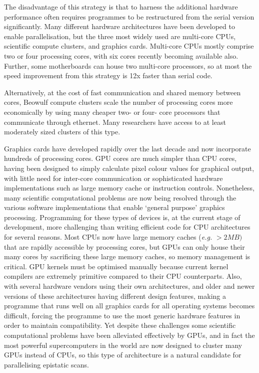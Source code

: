 The disadvantage of this strategy is that to harness the additional hardware performance often requires programmes to be restructured from the serial version significantly. Many different hardware architectures have been developed to enable parallelisation, but the three most widely used are multi-core CPUs, scientific compute clusters, and graphics cards. Multi-core CPUs mostly comprise two or four processing cores, with six cores recently becoming available also. Further, some motherboards can house two multi-core processors, so at most the speed improvement from this strategy is 12x faster than serial code.

Alternatively, at the cost of fast communication and shared memory between cores, Beowulf compute clusters scale the number of processing cores more economically by using many cheaper two- or four- core processors that communicate through ethernet. Many researchers have access to at least moderately sized clusters of this type.

Graphics cards have developed rapidly over the last decade and now incorporate hundreds of processing cores. GPU cores are much simpler than CPU cores, having been designed to simply calculate pixel colour values for graphical output, with little need for inter-core communication or sophisticated hardware implementations such as large memory cache or instruction controls. Nonetheless, many scientific computational problems are now being resolved through the various software implementations that enable `general purpose' graphics processing. Programming for these types of devices is, at the current stage of development, more challenging than writing efficient code for CPU architectures for several reasons. Most CPUs now have large memory caches (\emph{e.g.} $> 2MB)$ that are rapidly accessible by processing cores, but GPUs can only house their many cores by sacrificing these large memory caches, so memory management is critical. GPU kernels must be optimised manually because current kernel compilers are extremely primitive compared to their CPU counterparts. Also, with several hardware vendors using their own architectures, and older and newer versions of these architectures having different design features, making a programme that runs well on all graphics cards for all operating systems becomes difficult, forcing the programme to use the most generic hardware features in order to maintain compatibility. Yet despite these challenges some scientific computational problems have been alleviated effectively by GPUs, and in fact the most powerful supercomputers in the world are now designed to cluster many GPUs instead of CPUs, so this type of architecture is a natural candidate for parallelising epistatic scans.

